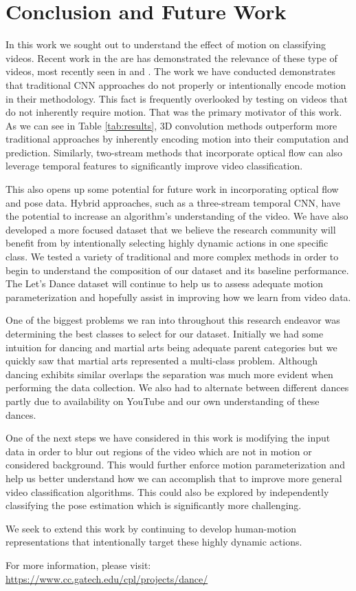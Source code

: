 \documentclass[10pt,twocolumn,letterpaper]{article}
\begin{document}
\section{Conclusion and Future Work}

In this work we sought out to understand the effect of motion on classifying videos. Recent work in the are has demonstrated the relevance of these type of videos, most recently seen in \cite{ava} and \cite{kinetics}. The work we have conducted demonstrates that traditional CNN approaches do not properly or intentionally encode motion in their methodology. This fact is frequently overlooked by testing on videos that do not inherently require motion. That was the primary motivator of this work. As we can see in Table \ref{tab:results}, 3D convolution methods outperform more traditional approaches by inherently encoding motion into their computation and prediction. Similarly, two-stream methods that incorporate optical flow can also leverage temporal features to significantly improve video classification.

This also opens up some potential for future work in incorporating optical flow and pose data. Hybrid approaches, such as a three-stream temporal CNN, have the potential to increase an algorithm's understanding of the video. We have also developed a more focused dataset that we believe the research community will benefit from by intentionally selecting highly dynamic actions in one specific class. We tested a variety of traditional and more complex methods in order to begin to understand the composition of our dataset and its baseline performance. The Let's Dance dataset will continue to help us to assess adequate motion parameterization and hopefully assist in improving how we learn from video data.

One of the biggest problems we ran into throughout this research endeavor was determining the best classes to select for our dataset. Initially we had some intuition for dancing and martial arts being adequate parent categories but we quickly saw that martial arts represented a multi-class problem. Although dancing exhibits similar overlaps the separation was much more evident when performing the data collection. We also had to alternate between different dances partly due to availability on YouTube and our own understanding of these dances.

One of the next steps we have considered in this work is modifying the input data in order to blur out regions of the video which are not in motion or considered background. This would further enforce motion parameterization and help us better understand how we can accomplish that to improve more general video classification algorithms. This could also be explored by independently classifying the pose estimation which is significantly more challenging.

We seek to extend this work by continuing to develop human-motion representations that intentionally target these highly dynamic actions. 

For more information, please visit: \url{https://www.cc.gatech.edu/cpl/projects/dance/}


{\small


}
\end{document}
